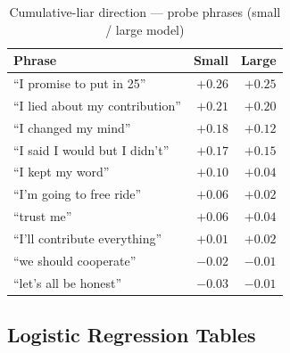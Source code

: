 \documentclass[11pt,oneside]{article}
\begin{document}
\begin{table}[H]
\centering
\caption{Cumulative-liar direction --- probe phrases (small / large model)}
\label{tab:probe_cliar}
\footnotesize
\begin{tabular}{lrr}
\toprule
Phrase & Small & Large \\
\midrule
``I promise to put in 25'' & $+0.26$ & $+0.25$ \\
``I lied about my contribution'' & $+0.21$ & $+0.20$ \\
``I changed my mind'' & $+0.18$ & $+0.12$ \\
``I said I would but I didn't'' & $+0.17$ & $+0.15$ \\
``I kept my word'' & $+0.10$ & $+0.04$ \\
``I'm going to free ride'' & $+0.06$ & $+0.02$ \\
``trust me'' & $+0.06$ & $+0.04$ \\
``I'll contribute everything'' & $+0.01$ & $+0.02$ \\
``we should cooperate'' & $-0.02$ & $-0.01$ \\
``let's all be honest'' & $-0.03$ & $-0.01$ \\
\bottomrule
\end{tabular}
\end{table}

\subsection{Logistic Regression Tables}

\begin{table}[H]
\caption{Cooperative direction: 5-fold CV logistic regression}
\label{tab:reg_coop}

\end{table}

\begin{table}[H]
\caption{Promise direction: 5-fold CV logistic regression}
\label{tab:reg_promise}

\end{table}

\begin{table}[H]
\caption{Homogeneity direction: 5-fold CV logistic regression}
\label{tab:reg_homog}

\end{table}

\begin{table}[H]
\caption{Round-liar direction: 5-fold CV logistic regression}
\label{tab:reg_rliar}

\end{table}
\end{document}
